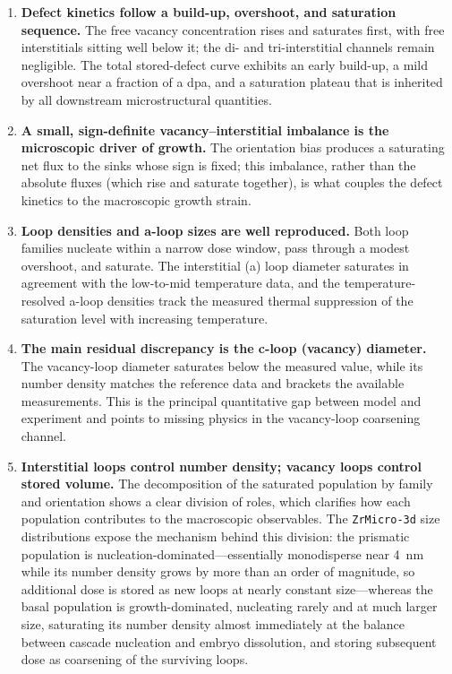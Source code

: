\documentclass{article}
\newcommand{\ZrM}{\texttt{ZrMicro-3d}}
\begin{document}
\begin{enumerate}
\item \textbf{Defect kinetics follow a build-up, overshoot, and saturation sequence.} The free vacancy concentration rises and saturates first, with free interstitials sitting well below it; the di- and tri-interstitial channels remain negligible. The total stored-defect curve exhibits an early build-up, a mild overshoot near a fraction of a dpa, and a saturation plateau that is inherited by all downstream microstructural quantities.
\item \textbf{A small, sign-definite vacancy–interstitial imbalance is the microscopic driver of growth.} The orientation bias produces a saturating net flux to the sinks whose sign is fixed; this imbalance, rather than the absolute fluxes (which rise and saturate together), is what couples the defect kinetics to the macroscopic growth strain.
\item \textbf{Loop densities and a-loop sizes are well reproduced.} Both loop families nucleate within a narrow dose window, pass through a modest overshoot, and saturate. The interstitial (a) loop diameter saturates in agreement with the low-to-mid temperature data, and the temperature-resolved a-loop densities track the measured thermal suppression of the saturation level with increasing temperature.
\item \textbf{The main residual discrepancy is the c-loop (vacancy) diameter.} The vacancy-loop diameter saturates below the measured value, while its number density matches the reference data and brackets the available measurements. This is the principal quantitative gap between model and experiment and points to missing physics in the vacancy-loop coarsening channel.
\item \textbf{Interstitial loops control number density; vacancy loops control stored volume.} The decomposition of the saturated population by family and orientation shows a clear division of roles, which clarifies how each population contributes to the macroscopic observables. The {\ZrM} size distributions expose the mechanism behind this division: the prismatic population is nucleation-dominated---essentially monodisperse near 4~nm while its number density grows by more than an order of magnitude, so additional dose is stored as new loops at nearly constant size---whereas the basal population is growth-dominated, nucleating rarely and at much larger size, saturating its number density almost immediately at the balance between cascade nucleation and embryo dissolution, and storing subsequent dose as coarsening of the surviving loops.

\end{enumerate}
\end{document}
